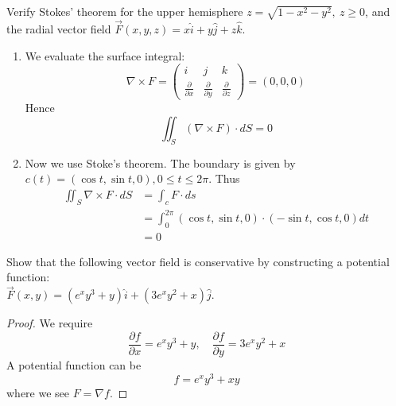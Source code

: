 \documentclass[openany]{book}
\begin{document}
\begin{prob}
    Verify Stokes' theorem for the upper hemisphere $z = \sqrt{1 - x^2 - y^2}, \ z \geq 0$, and the radial vector field $\vec{F}(x, y, z) = x\hat{i} + y\hat{j} + z\hat{k}$.
\end{prob}
\begin{enumerate}
    \item We evaluate the surface integral: 
    \begin{equation*}
        \nabla\times F=\begin{pmatrix}
            i&j&k\\
            \frac{\partial}{\partial x}&\frac{\partial}{\partial y}&\frac{\partial}{\partial z}
        \end{pmatrix}=(0,0,0)
    \end{equation*}
    Hence 
    \begin{equation*}
        \iint_S(\nabla\times F)\cdot dS=0
    \end{equation*}
    \item Now we use Stoke's theorem. The boundary is given by $c(t)=(\cos t, \sin t, 0), 0\leq t\leq 2\pi$. Thus 
    \begin{align*}
        \iint_S\nabla\times F\cdot dS&=\int_c F\cdot ds\\
        &=\int_0^{2\pi}(\cos t, \sin t, 0)\cdot (-\sin t, \cos t, 0)dt\\
        &=0
    \end{align*}
\end{enumerate}

\begin{prob}
    Show that the following vector field is conservative by constructing a potential function:\\
    $\vec{F}(x, y) = (e^x y^3 + y)\hat{i} + (3e^x y^2 + x)\hat{j}$.
\end{prob}
\begin{proof}
    We require 
    \begin{equation*}
        \frac{\partial f}{\partial x}=e^xy^3+y, \quad \frac{\partial f}{\partial y}=3e^xy^2+x
    \end{equation*}
    A potential function can be 
    \begin{equation*}
        f=e^xy^3+xy
    \end{equation*}
    where we see $F=\nabla f$. 
\end{proof}
\end{document}
